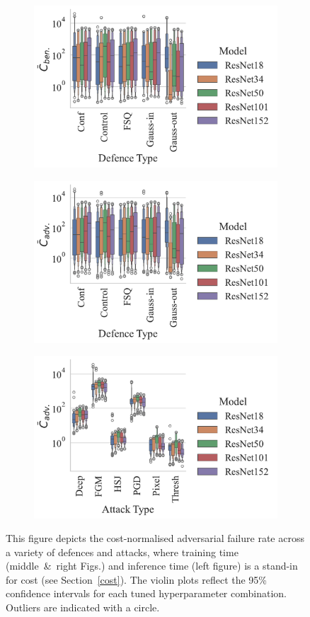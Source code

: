 \begin{figure}[!h]
    \centering
    \begin{subfigure}
        \centering
        \includegraphics[width=.38\textwidth,trim={12pt 10pt 20pt pt},clip]{plots/ben_failures_per_train_time_vs_defence_type.pdf}
    \end{subfigure}
    \begin{subfigure}
        \centering
        \includegraphics[width=.38\textwidth,trim={12pt 10pt 20pt 10pt},clip]{plots/adv_failures_per_train_time_vs_defence_type.pdf}
    \end{subfigure}
    \begin{subfigure}
        \centering
        \includegraphics[width=.38\textwidth,trim={12pt 10pt 20pt 10pt},clip]{plots/adv_failures_per_train_time_vs_attack_type.pdf}
    \end{subfigure}
    \caption{This figure depicts the cost-normalised adversarial failure rate across a variety of defences and attacks, where training time (middle~\&~right Figs.) and inference time (left figure) is a stand-in for cost (see Section~\ref{cost}). The violin plots reflect the 95\% confidence intervals for each tuned hyperparameter combination. Outliers are indicated with a circle.}
    \label{fig:failures_per_train_time}
\end{figure}